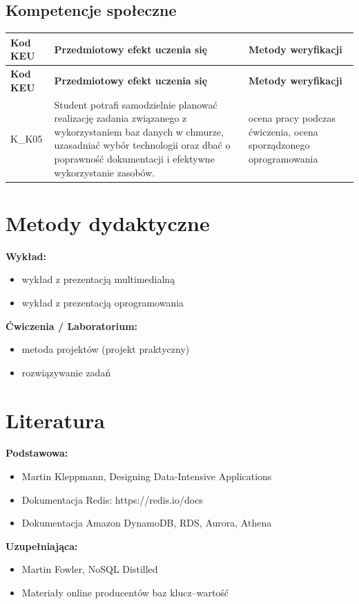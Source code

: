 \documentclass[12pt, a4paper]{article}
\newcommand{\thdrule}{\noalign{\global\setlength{\extrarowheight}{0pt}}}
\newcommand{\thdend}{\noalign{\global\setlength{\extrarowheight}{3pt}}}
\begin{document}
\subsection*{Kompetencje społeczne}
{\scriptsize
\begin{longtable}{m{1.6cm}m{9.0cm}m{4.2cm}}
\thdrule\toprule
\rowcolor{pjatkRed} {\color{white}\footnotesize\textbf{\vphantom{Ag}Kod KEU}} & {\color{white}\footnotesize\textbf{\vphantom{Ag}Przedmiotowy efekt uczenia się}} & {\color{white}\footnotesize\textbf{\vphantom{Ag}Metody weryfikacji}} \\
\midrule\thdend
\endfirsthead
\thdrule\toprule
\rowcolor{pjatkRed} {\color{white}\footnotesize\textbf{\vphantom{Ag}Kod KEU}} & {\color{white}\footnotesize\textbf{\vphantom{Ag}Przedmiotowy efekt uczenia się}} & {\color{white}\footnotesize\textbf{\vphantom{Ag}Metody weryfikacji}} \\
\midrule\thdend
\endhead
  \rowcolor{tableRowLight} K\_K05 & Student potrafi samodzielnie planować realizację zadania związanego z wykorzystaniem baz danych w chmurze, uzasadniać wybór technologii oraz dbać o poprawność dokumentacji i efektywne wykorzystanie zasobów. & ocena pracy podczas ćwiczenia, ocena sporządzonego oprogramowania \\
\bottomrule
\end{longtable}}

\section{Metody dydaktyczne}

\textbf{Wykład:}
\begin{itemize}
  \item wykład z prezentacją multimedialną
  \item wykład z prezentacją oprogramowania
\end{itemize}
\vspace{4pt}
\textbf{Ćwiczenia / Laboratorium:}
\begin{itemize}
  \item metoda projektów (projekt praktyczny)
  \item rozwiązywanie zadań
\end{itemize}
\vspace{4pt}


\section{Literatura}

\textbf{Podstawowa:}
\begin{itemize}
  \item Martin Kleppmann, Designing Data-Intensive Applications
  \item Dokumentacja Redis: https://redis.io/docs
  \item Dokumentacja Amazon DynamoDB, RDS, Aurora, Athena
\end{itemize}

\textbf{Uzupełniająca:}
\begin{itemize}
  \item Martin Fowler, NoSQL Distilled
  \item Materiały online producentów baz klucz–wartość
\end{itemize}
\end{document}
